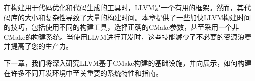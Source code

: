 在构建用于代码优化和代码生成的工具时，LLVM是一个有用的框架。然而，其代码库的大小和复杂性导致了大量的构建时间。本章提供了一些加快LLVM构建时间的技巧，包括使用不同的构建工具，选择正确的CMake参数，甚至采用一个非CMake的构建系统。当使用LLVM进行开发时，这些技能减少了不必要的资源浪费并提高了您的生产力。


下一章，我们将深入研究LLVM基于CMake构建的基础设施，并向展示，如何构建在许多不同开发环境中至关重要的系统特性和指南。



